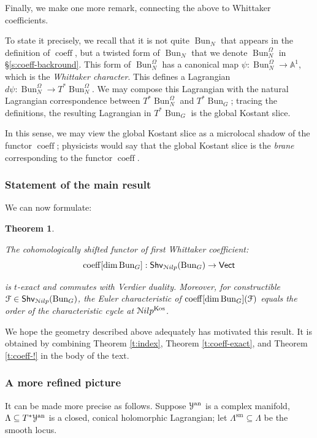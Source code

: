 \documentclass[reqno,11pt]{amsart}
\numberwithin{equation}{subsection}
\newtheorem{introthm}{Theorem}
\theoremstyle{remark}
\newcommand{\bA}{{\mathbb A}}
\newcommand{\sF}{{\EuScript F}}
\newcommand{\sN}{{\EuScript N}}
\newcommand{\sY}{{\EuScript Y}}
\newcommand{\on}{\operatorname}
\newcommand{\Vect}{\mathsf{Vect}}
\newcommand{\Bun}{\on{Bun}}
\renewcommand{\subset}{\subseteq}
\newcommand{\coeff}{\on{coeff}}
\newcommand{\Shv}{\mathsf{Shv}}
\newcommand{\Nilp}{\sN ilp}
\newcommand{\Kos}{\on{Kos}}
\begin{document}
Finally, we make one more remark, connecting the 
above to Whittaker coefficients. 

To state it precisely,
we recall that it is not quite $\Bun_N$ that appears in the definition 
of $\coeff$, but a twisted form of $\Bun_N$ that we denote $\Bun_N^{\Omega}$
in \S \ref{s:coeff-backround}.
This form of $\Bun_N^{\Omega}$ has a canonical map 
$\psi:\Bun_N^{\Omega} \to \bA^1$, which is the \emph{Whittaker character}.
This defines a Lagrangian $d\psi:\Bun_N^{\Omega} \to T^*\Bun_N^{\Omega}$.
We may compose this Lagrangian with the natural Lagrangian
correspondence between $T^*\Bun_N^{\Omega}$ and $T^*\Bun_G$;
tracing the definitions, the resulting Lagrangian in $T^*\Bun_G$
is the global Kostant slice. 

In this sense, we may view the global Kostant slice as a microlocal
shadow of the functor $\coeff$; physicists would say that the
global Kostant slice is the \emph{brane} corresponding to the functor
$\coeff$.  

\subsubsection{Statement of the main result}

We can now formulate:

\begin{introthm}\label{it:micro}

The cohomologically shifted functor of first Whittaker coefficient:
%
\[
\coeff[\dim \Bun_G]:\Shv_{\Nilp}(\Bun_G) \to \Vect
\]

\noindent is $t$-exact and commutes with Verdier duality.
Moreover, for constructible $\sF \in \Shv_{\Nilp}(\Bun_G)$,
the Euler characteristic of $\coeff[\dim \Bun_G](\sF)$ 
equals the order of the characteristic cycle at $\Nilp^{\Kos}$.

\end{introthm}

We hope the geometry described above adequately has 
motivated this result.
It is obtained by combining Theorem \ref{t:index}, 
Theorem \ref{t:coeff-exact}, and Theorem \ref{t:coeff-!}
in the body of the text.

\subsubsection{A more refined picture}

It can be made more precise as follows. Suppose $\sY^{\on{an}}$ 
is a complex manifold, $\Lambda \subset T^*\sY^{\on{an}}$ is a closed, conical
holomorphic Lagrangian; let $\Lambda^{\on{sm}} \subset \Lambda$ be the smooth locus.
\end{document}
